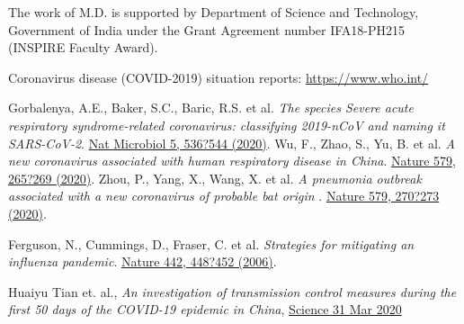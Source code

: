 \documentclass[aps,prd,10pt,twocolumn,nofootinbib]{revtex4-2}
\begin{document}
\begin{acknowledgements}
The work of M.D. is supported by Department of Science and Technology, Government of India under the Grant Agreement number IFA18-PH215 (INSPIRE Faculty Award).
\end{acknowledgements}

\begin{thebibliography}{99}

Coronavirus disease (COVID-2019) situation reports: 
\href{https://www.who.int/emergencies/diseases/novel-coronavirus-2019/situation-reports}{https://www.who.int/}

Gorbalenya, A.E., Baker, S.C., Baric, R.S. et al. 
{\it The species Severe acute respiratory syndrome-related coronavirus: 
classifying 2019-nCoV and naming it SARS-CoV-2}. \href{https://doi.org/10.1038/s41564-020-0695-z}
{Nat Microbiol 5, 536?544 (2020)}.
Wu, F., Zhao, S., Yu, B. et al. {\it A new coronavirus associated with human respiratory disease in China}. 
\href{https://doi.org/10.1038/s41586-020-2008-3}{Nature 579, 265?269 (2020)}. 
Zhou, P., Yang, X., Wang, X. et al.
{\it A pneumonia outbreak associated with a new coronavirus of probable bat origin } . 
\href{https://doi.org/10.1038/s41586-020-2012-7}{Nature 579, 270?273 (2020)}. 



Ferguson, N., Cummings, D., Fraser, C. et al. 
{\it Strategies for mitigating an influenza pandemic}. 
\href{https://doi.org/10.1038/nature04795}{Nature 442, 448?452 (2006)}.  

Huaiyu Tian et. al., 
{\it An investigation of transmission control measures during the first 50 days of the 
COVID-19 epidemic in China}, 
\href{https://science.sciencemag.org/content/early/2020/03/30/science.abb6105}{Science  31 Mar 2020}



\end{thebibliography}
\end{document}
